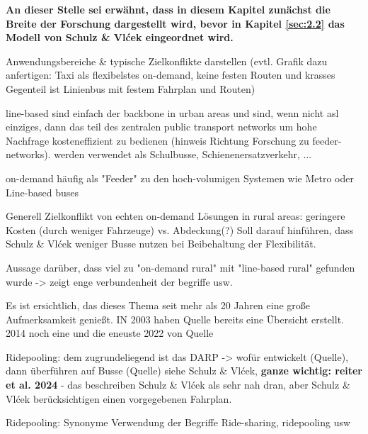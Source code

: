 \textbf{An dieser Stelle sei erwähnt, dass in diesem Kapitel zunächst die Breite der Forschung dargestellt wird, bevor in Kapitel \ref{sec:2.2} das Modell von Schulz \& Vlćek eingeordnet wird.}

Anwendungsbereiche \& typische Zielkonflikte darstellen (evtl. Grafik dazu anfertigen: Taxi als flexibelstes on-demand, keine festen Routen und krasses Gegenteil ist Linienbus mit festem Fahrplan und Routen)

line-based sind einfach der backbone in urban areas und sind, wenn nicht asl einziges, dann das teil des zentralen public transport networks um hohe Nachfrage kosteneffizient zu bedienen (hinweis Richtung Forschung zu feeder-networks). werden verwendet als Schulbusse, Schienenersatzverkehr, ...

on-demand häufig als "Feeder" zu den hoch-volumigen Systemen wie Metro oder Line-based buses

Generell Zielkonflikt von echten on-demand Lösungen in rural areas: geringere Kosten (durch weniger Fahrzeuge) vs. Abdeckung(?) Soll darauf hinführen, dass Schulz \& Vlćek weniger Busse nutzen bei Beibehaltung der Flexibilität.

Aussage darüber, dass viel zu "on-demand rural" mit "line-based rural" gefunden wurde -> zeigt enge verbundenheit der begriffe usw.

Es ist ersichtlich, das dieses Thema seit mehr als 20 Jahren eine große Aufmerksamkeit genießt. IN 2003 haben Quelle bereits eine Übersicht erstellt. 2014 noch eine und die eneuste 2022 von Quelle

Ridepooling: dem zugrundeliegend ist das DARP -> wofür entwickelt (Quelle), dann überführen auf Busse (Quelle) siehe Schulz \& Vlćek, \textbf{ganze wichtig: reiter et al. 2024} - das beschreiben Schulz \& Vlćek als sehr nah dran, aber Schulz \& Vlćek berücksichtigen einen vorgegebenen Fahrplan. 

Ridepooling: Synonyme Verwendung der Begriffe Ride-sharing, ridepooling usw

